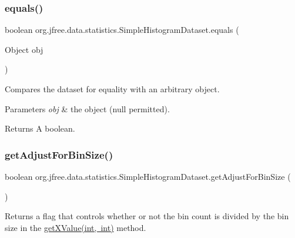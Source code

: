 \subsubsection{\texorpdfstring{equals()}{equals()}}
{\footnotesize\ttfamily boolean org.\+jfree.\+data.\+statistics.\+Simple\+Histogram\+Dataset.\+equals (\begin{DoxyParamCaption}\item[{Object}]{obj }\end{DoxyParamCaption})}

Compares the dataset for equality with an arbitrary object.


\begin{DoxyParams}{Parameters}
{\em obj} & the object ({\ttfamily null} permitted).\\
\hline
\end{DoxyParams}
\begin{DoxyReturn}{Returns}
A boolean. 
\end{DoxyReturn}
\mbox{\label{classorg_1_1jfree_1_1data_1_1statistics_1_1_simple_histogram_dataset_a09695f11377643bfcc614305251d5d03}} 
\subsubsection{\texorpdfstring{get\+Adjust\+For\+Bin\+Size()}{getAdjustForBinSize()}}
{\footnotesize\ttfamily boolean org.\+jfree.\+data.\+statistics.\+Simple\+Histogram\+Dataset.\+get\+Adjust\+For\+Bin\+Size (\begin{DoxyParamCaption}{ }\end{DoxyParamCaption})}

Returns a flag that controls whether or not the bin count is divided by the bin size in the \mbox{\hyperlink{classorg_1_1jfree_1_1data_1_1statistics_1_1_simple_histogram_dataset_abe5b334c787c634308cfd38c39be0a22}{get\+X\+Value(int, int)}} method.

